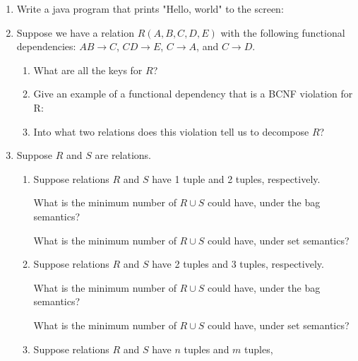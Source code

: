 {{\begin{enumerate}
\item Write a java program that prints "Hello, world" to the screen:

\newpage

\item Suppose we have a relation $R(A,B,C,D,E)$ with the following
functional dependencies: $AB\rightarrow C$, $CD\rightarrow E$,
$C \rightarrow A$, and $C \rightarrow D$.
\begin{enumerate}
  \item What are all the keys for $R$?
     \vspace{.75in}
  \item Give an example of a functional dependency that is a 
	BCNF violation for R:
     \vspace{.4in}
  \item Into what two relations does this violation tell us to
	decompose $R$?
     \vspace{.4in}
\end{enumerate}

\item Suppose $R$ and $S$ are relations.
  \begin{enumerate}
    \item Suppose relations $R$ and $S$ have 1 tuple and 2 tuples,
	respectively.  

	What is the minimum number of $R\cup S$ could have, under the
	bag semantics?
	\vspace{.5in}

	What is the minimum number of $R\cup S$ could have, under 
	set semantics?
	\vspace{.5in}

    \item Suppose relations $R$ and $S$ have 2 tuples and 3 tuples,
	respectively.  

	What is the minimum number of $R\cup S$ could have, under the
	bag semantics?
	\vspace{.5in}

	What is the minimum number of $R\cup S$ could have, under 
	set semantics?
	\vspace{.5in}

    \item Suppose relations $R$ and $S$ have $n$ tuples and $m$ tuples,


\end{enumerate}
\end{enumerate}}}
